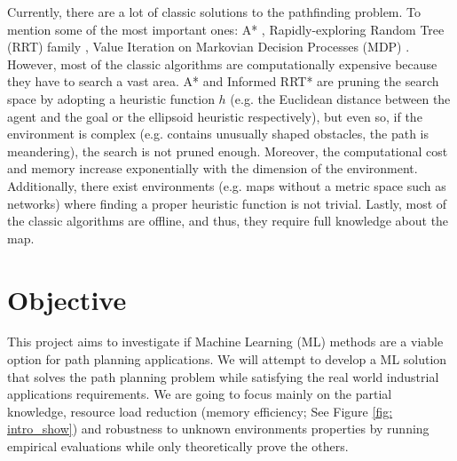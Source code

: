 
Currently, there are a lot of classic solutions to the pathfinding problem. To mention some of the most important ones: A* \cite{choset2005principles, duchovn2014path, zhang2014multiple, 5937169}, Rapidly-exploring Random Tree (RRT) family \cite{lavalle1998rapidly, rodriguez2006obstacle, lavalle2001randomized, karaman2011sampling}, Value Iteration on Markovian Decision Processes (MDP) \cite{szepesvari2010algorithms, satia1973markovian}. However, most of the classic algorithms are computationally expensive because they have to search a vast area. A* and Informed RRT* are pruning the search space by adopting a heuristic function $h$ (e.g. the Euclidean distance between the agent and the goal or the ellipsoid heuristic respectively), but even so, if the environment is complex (e.g. contains unusually shaped obstacles, the path is meandering), the search is not pruned enough. Moreover, the computational cost and memory increase exponentially with the dimension of the environment. Additionally, there exist environments (e.g. maps without a metric space such as networks) where finding a proper heuristic function is not trivial. Lastly, most of the classic algorithms are offline, and thus, they require full knowledge about the map.

\section{Objective}

This project aims to investigate if Machine Learning (ML) methods are a viable option for path planning applications. We will attempt to develop a ML solution that solves the path planning problem while satisfying the real world industrial applications requirements. We are going to focus mainly on the partial knowledge, resource load reduction (memory efficiency; See Figure \ref{fig: intro_show}) and robustness to unknown environments properties by running empirical evaluations while only theoretically prove the others.

